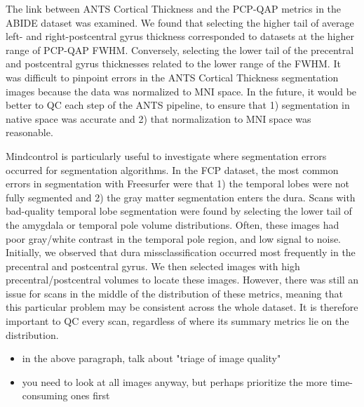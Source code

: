 The link between ANTS Cortical Thickness and the PCP-QAP metrics in the ABIDE dataset was examined. We found that selecting the higher tail of average left- and right-postcentral gyrus thickness corresponded to datasets at the higher range of PCP-QAP FWHM. Conversely, selecting the lower tail of the precentral and postcentral gyrus thicknesses related to the lower range of the FWHM. It was difficult to pinpoint errors in the ANTS Cortical Thickness segmentation images because the data was normalized to MNI space. In the future, it would be better to QC each step of the ANTS pipeline, to ensure that 1) segmentation in native space was accurate and 2) that normalization to MNI space was reasonable. 

Mindcontrol is particularly useful to investigate where segmentation errors occurred for segmentation algorithms. In the FCP dataset, the most common errors in segmentation with Freesurfer were that 1) the temporal lobes were not fully segmented and 2) the gray matter segmentation enters the dura. Scans with bad-quality temporal lobe segmentation were found by selecting the lower tail of the amygdala or temporal pole volume distributions. Often, these images had poor gray/white contrast in the temporal pole region, and low signal to noise. Initially, we observed that dura missclassification occurred most frequently in the precentral and postcentral gyrus. We then selected images with high precentral/postcentral volumes to locate these images. However, there was still an issue for scans in the middle of the distribution of these metrics, meaning that this particular problem may be consistent across the whole dataset. It is therefore important to QC every scan, regardless of where its summary metrics lie on the distribution.  

\begin{itemize}
\item in the above paragraph, talk about "triage of image quality" 
\item you need to look at all images anyway, but perhaps prioritize the more time-consuming ones first
\end{itemize}



